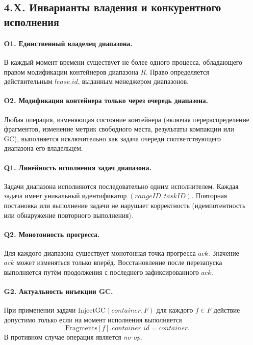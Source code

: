 \documentclass[a4paper,12pt]{article}
\begin{document}
    \subsection*{4.X. Инварианты владения и конкурентного исполнения}

    \paragraph{O1. Единственный владелец диапазона.}
    В каждый момент времени существует не более одного процесса,
    обладающего правом модификации контейнеров диапазона $R$.
    Право определяется действительным $lease.id$, выданным менеджером диапазонов.

    \paragraph{O2. Модификация контейнера только через очередь диапазона.}
    Любая операция, изменяющая состояние контейнера
    (включая перераспределение фрагментов, изменение метрик свободного места,
    результаты компакции или GC),
    выполняется исключительно как задача очереди соответствующего диапазона
    его владельцем.

    \paragraph{Q1. Линейность исполнения задач диапазона.}
    Задачи диапазона исполняются последовательно одним исполнителем.
    Каждая задача имеет уникальный идентификатор $(rangeID, taskID)$.
    Повторная постановка или выполнение задачи не нарушает корректность
    (идемпотентность или обнаружение повторного выполнения).

    \paragraph{Q2. Монотонность прогресса.}
    Для каждого диапазона существует монотонная точка прогресса $ack$.
    Значение $ack$ может изменяться только вперёд.
    Восстановление после перезапуска выполняется путём продолжения
    с последнего зафиксированного $ack$.

    \paragraph{G2. Актуальность инъекции GC.}
    При применении задачи $\mathrm{InjectGC}(container, F)$
    для каждого $f \in F$ действие допустимо только если
    на момент исполнения выполняется
    \[
        \mathrm{Fragments}[f].container\_id = container.
    \]
    В противном случае операция является \emph{no-op}.
\end{document}
